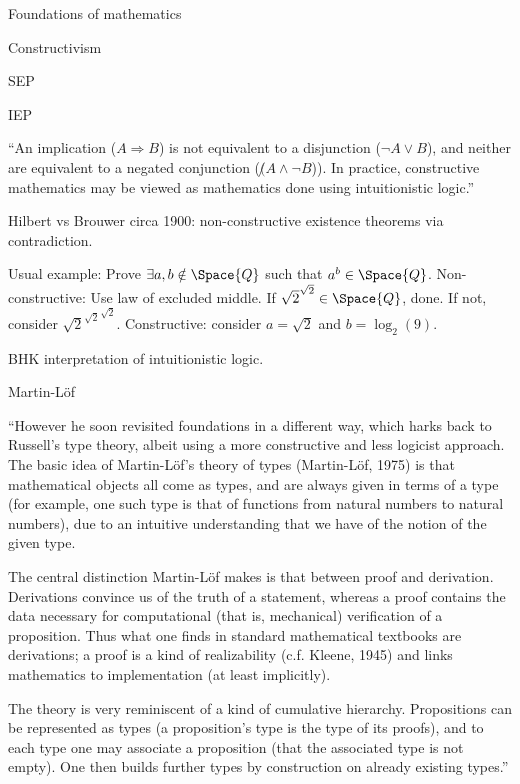 \begin{plSection}{Foundations of mathematics}
\begin{plSection}{Constructivism}
\begin{plSection}{SEP}
\end{plSection}%
\begin{plSection}{IEP}
\label{sec:Constructivism_IEP}
\cite{iep:ConstructiveMathematics}

``An implication ($A \Rightarrow B$) is not equivalent 
to a disjunction ($\lnot A \vee B$), 
and neither are equivalent to a negated conjunction 
($\not (A \wedge \lnot B$)). 
In practice, constructive mathematics may be viewed 
as mathematics done using intuitionistic 
logic.''\cite{iep:ConstructiveMathematics}

Hilbert vs Brouwer circa 1900: 
non-constructive existence theorems via contradiction.

Usual example: Prove $\exists a,b \notin \Space{Q}$
such that $a^b \in \Space{Q}$. \hfill\break
Non-constructive: Use law of excluded middle.
If $\sqrt{2}^{\sqrt{2}} \in \Space{Q}$, done.
If not, consider ${\sqrt{2}^{\sqrt{2}}}^{\sqrt{2}}$.
\hfill\break
Constructive: consider $a=\sqrt{2}$ and $b=\log_2(9)$.

BHK interpretation of intuitionistic 
logic\cite{wiki:BrouwerHeytingKolmogorovInterpretation}.

\end{plSection}%
\begin{plSection}{Martin-L\"{o}f}
\label{sec:Martin_Lof_IEP}

``However he soon revisited foundations in a different way, 
which harks back to Russell's type theory, 
albeit using a more constructive and less logicist approach. 
The basic idea of Martin-Löf's theory of types (Martin-Löf, 1975) 
is
that mathematical objects all come as types, 
and are always given in terms of a
type (for example, one such type is that of functions 
from natural numbers to
natural numbers), due to an intuitive understanding 
that we have of the notion
of the given type.

The central distinction Martin-Löf makes is that 
between proof and derivation.
Derivations convince us of the truth of a statement, 
whereas a proof contains the data necessary for computational
(that is, mechanical) verification of a proposition. 
Thus what one finds in standard mathematical textbooks are
derivations; 
a proof is a kind of realizability (c.f. Kleene, 1945) and links
mathematics to implementation (at least implicitly).

The theory is very reminiscent of a kind of cumulative hierarchy. 
Propositions can be represented as types 
(a proposition's type is the type of its proofs),
and to each type one may associate a proposition 
(that the associated type is not empty). 
One then builds further types by construction on already existing
types.''


\end{plSection}
\end{plSection}
\end{plSection}
